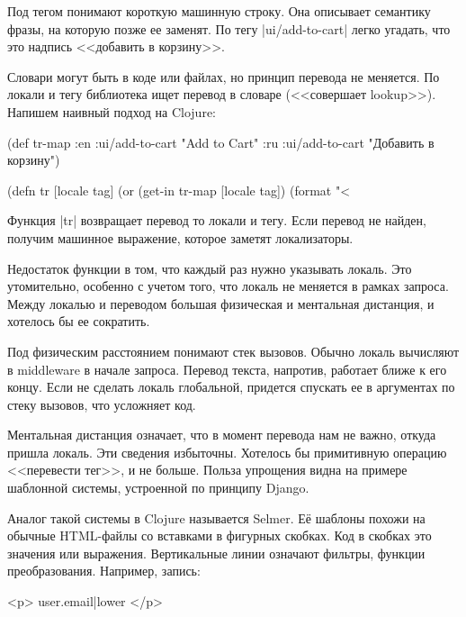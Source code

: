 Под тегом понимают короткую машинную строку. Она описывает семантику фразы, на
которую позже ее заменят. По тегу \spverb|ui/add-to-cart| легко
угадать, что это надпись <<добавить в корзину>>.

Словари могут быть в коде или файлах, но принцип перевода не меняется. По локали
и тегу библиотека ищет перевод в словаре (<<совершает lookup>>). Напишем
наивный подход на Clojure:

  \begin{clojure}
(def tr-map
  {:en {:ui/add-to-cart "Add to Cart"}
   :ru {:ui/add-to-cart "Добавить в корзину"}})

(defn tr [locale tag]
  (or (get-in tr-map [locale tag])
      (format "<%
  \end{clojure}

Функция \spverb|tr| возвращает перевод то локали и тегу. Если перевод не найден,
получим машинное выражение, которое заметят локализаторы.

Недостаток функции в том, что каждый раз нужно указывать локаль. Это
утомительно, особенно с учетом того, что локаль не меняется в рамках
запроса. Между локалью и переводом большая физическая и ментальная
дистанция, и хотелось бы ее сократить.

Под физическим расстоянием понимают стек вызовов. Обычно локаль вычисляют в
middleware в начале запроса. Перевод текста, напротив, работает ближе к его
концу. Если не сделать локаль глобальной, придется спускать ее в аргументах по
стеку вызовов, что усложняет код.

Ментальная дистанция означает, что в момент перевода нам не важно, откуда пришла
локаль. Эти сведения избыточны. Хотелось бы примитивную операцию <<перевести
тег>>, и не больше. Польза упрощения видна на примере шаблонной системы,
устроенной по принципу
Django.

Аналог такой системы в Clojure называется
Selmer. Е\"{е} шаблоны похожи на
обычные HTML-файлы со вставками в фигурных скобках. Код в скобках это значения
или выражения. Вертикальные линии означают фильтры, функции
преобразования. Например, запись:

\begin{english}
  \begin{htmldjango}
<p>{{ user.email|lower }}</p>
  \end{htmldjango}
\end{english}

